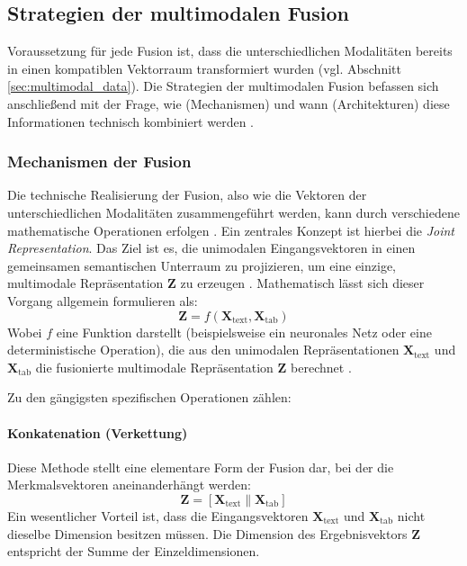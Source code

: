 \subsection{Strategien der multimodalen Fusion}

Voraussetzung für jede Fusion ist, dass die unterschiedlichen Modalitäten bereits in einen kompatiblen Vektorraum transformiert wurden (vgl. Abschnitt \ref{sec:multimodal_data}). Die Strategien der multimodalen Fusion befassen sich anschließend mit der Frage, wie (Mechanismen) und wann (Architekturen) diese Informationen technisch kombiniert werden \cite{Li2024, Baltrusaitis2019}.

\subsubsection{Mechanismen der Fusion}

Die technische Realisierung der Fusion, also wie die Vektoren der unterschiedlichen Modalitäten zusammengeführt werden, kann durch verschiedene mathematische Operationen erfolgen \cite{Jiao2024, Baltrusaitis2019}.
Ein zentrales Konzept ist hierbei die \textit{Joint Representation}. Das Ziel ist es, die unimodalen Eingangsvektoren in einen gemeinsamen semantischen Unterraum zu projizieren, um eine einzige, multimodale Repräsentation $\mathbf{Z}$ zu erzeugen \cite{Jiao2024, Li2024}.
Mathematisch lässt sich dieser Vorgang allgemein formulieren als:
\begin{equation}
    \mathbf{Z} = f(\mathbf{X}_{\text{text}}, \mathbf{X}_{\text{tab}})
\end{equation}
Wobei $f$ eine Funktion darstellt (beispielsweise ein neuronales Netz oder eine deterministische Operation), die aus den unimodalen Repräsentationen $\mathbf{X}_{\text{text}}$ und $\mathbf{X}_{\text{tab}}$ die fusionierte multimodale Repräsentation $\mathbf{Z}$ berechnet \cite{Baltrusaitis2019}.

Zu den gängigsten spezifischen Operationen zählen:

\paragraph{Konkatenation (Verkettung)}
Diese Methode stellt eine elementare Form der Fusion dar, bei der die Merkmalsvektoren aneinanderhängt werden:
\begin{equation}
    \mathbf{Z} = [\mathbf{X}_{\text{text}} \parallel \mathbf{X}_{\text{tab}}]
\end{equation}
Ein wesentlicher Vorteil ist, dass die Eingangsvektoren $\mathbf{X}_{\text{text}}$ und $\mathbf{X}_{\text{tab}}$ nicht dieselbe Dimension besitzen müssen. Die Dimension des Ergebnisvektors $\mathbf{Z}$ entspricht der Summe der Einzeldimensionen. 

